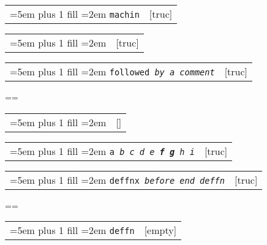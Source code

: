 \documentclass{book}
\makeatletter
\newenvironment{GNUTexinfopreformatted}{%
  \par\GNUTobeylines\obeyspaces\frenchspacing
  \parskip=\z@\parindent=\z@}{}
{\catcode`\^^M=13 \gdef\GNUTobeylines{\catcode`\^^M=13 \def^^M{\null\par}}}
\newenvironment{GNUTexinfoindented}
  {\begin{list}{}{}
  \item\relax}
  {\end{list}}
\makeatother
\begin{document}
\begin{GNUTexinfoindented}
%

\noindent\begin{tabularx}{\linewidth}{@{}Xr}
\rightskip=5em plus 1 fill
\hangindent=2em
\texttt{machin}& [truc]
\end{tabularx}

%

\noindent\begin{tabularx}{\linewidth}{@{}Xr}
\rightskip=5em plus 1 fill
\hangindent=2em
\texttt{}& [truc]
\end{tabularx}


\noindent\begin{tabularx}{\linewidth}{@{}Xr}
\rightskip=5em plus 1 fill
\hangindent=2em
\texttt{followed \EmbracOn{}\textnormal{\textsl{by a comment}}\EmbracOff{}}& [truc]
\end{tabularx}

%
\begin{GNUTexinfopreformatted}%
\ttfamily \end{GNUTexinfopreformatted}

\noindent\begin{tabularx}{\linewidth}{@{}Xr}
\rightskip=5em plus 1 fill
\hangindent=2em
\texttt{}& []
\end{tabularx}


\noindent\begin{tabularx}{\linewidth}{@{}Xr}
\rightskip=5em plus 1 fill
\hangindent=2em
\texttt{a \EmbracOn{}\textnormal{\textsl{b c d e \textbf{f g} h i}}\EmbracOff{}}& [truc]
\end{tabularx}

%

\noindent\begin{tabularx}{\linewidth}{@{}Xr}
\rightskip=5em plus 1 fill
\hangindent=2em
\texttt{deffnx \EmbracOn{}\textnormal{\textsl{before end deffn}}\EmbracOff{}}& [truc]
\end{tabularx}

%
\begin{GNUTexinfopreformatted}%
\ttfamily 

\end{GNUTexinfopreformatted}

\noindent\begin{tabularx}{\linewidth}{@{}Xr}
\rightskip=5em plus 1 fill
\hangindent=2em
\texttt{deffn}& [empty]
\end{tabularx}


\end{GNUTexinfoindented}
\end{document}
